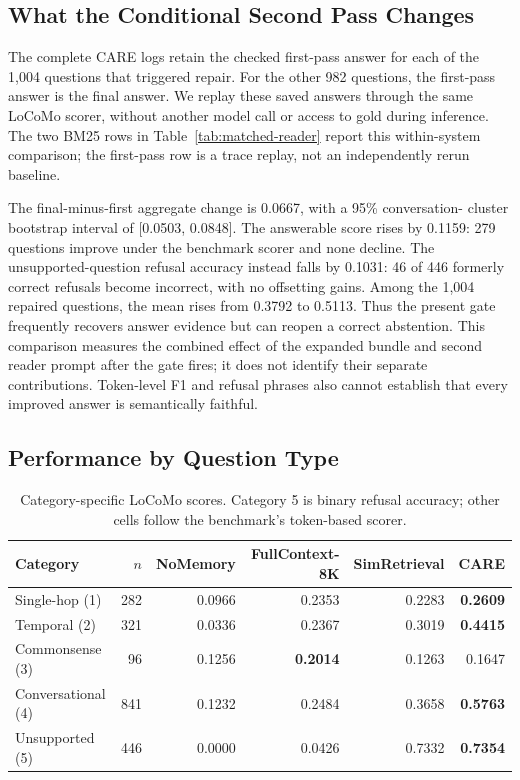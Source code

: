 \documentclass[11pt]{article}
\newcommand{\care}{\textsc{CARE}}
\begin{document}
\subsection{What the Conditional Second Pass Changes}
\label{sec:first-pass}

The complete \care{} logs retain the checked first-pass answer for each of
the 1,004 questions that triggered repair. For the other 982 questions, the
first-pass answer is the final answer. We replay these saved answers through
the same LoCoMo scorer, without another model call or access to gold during
inference. The two BM25 rows in Table~\ref{tab:matched-reader} report this
within-system comparison; the first-pass row is a trace replay, not an
independently rerun baseline.

The final-minus-first aggregate change is 0.0667, with a 95\% conversation-
cluster bootstrap interval of [0.0503, 0.0848]. The answerable score rises
by 0.1159: 279 questions improve under the benchmark scorer and none decline.
The unsupported-question refusal accuracy instead falls by 0.1031: 46 of
446 formerly correct refusals become incorrect, with no offsetting gains.
Among the 1,004 repaired questions, the mean rises from 0.3792 to 0.5113.
Thus the present gate frequently recovers answer evidence but can reopen a
correct abstention. This comparison measures the combined effect of the
expanded bundle and second reader prompt after the gate fires; it does not
identify their separate contributions. Token-level F1 and refusal phrases
also cannot establish that every improved answer is semantically faithful.

\subsection{Performance by Question Type}

\begin{table}[t]
\centering
\caption{Category-specific LoCoMo scores. Category 5 is binary refusal
accuracy; other cells follow the benchmark's token-based scorer.}
\label{tab:category}
\small
\begin{tabular}{lrrrrr}
\toprule
Category & $n$ & NoMemory & FullContext-8K & SimRetrieval & \care{} \\
\midrule
Single-hop (1) & 282 & 0.0966 & 0.2353 & 0.2283 & \textbf{0.2609} \\
Temporal (2) & 321 & 0.0336 & 0.2367 & 0.3019 & \textbf{0.4415} \\
Commonsense (3) & 96 & 0.1256 & \textbf{0.2014} & 0.1263 & 0.1647 \\
Conversational (4) & 841 & 0.1232 & 0.2484 & 0.3658 & \textbf{0.5763} \\
Unsupported (5) & 446 & 0.0000 & 0.0426 & 0.7332 & \textbf{0.7354} \\
\bottomrule
\end{tabular}
\end{table}
\end{document}

